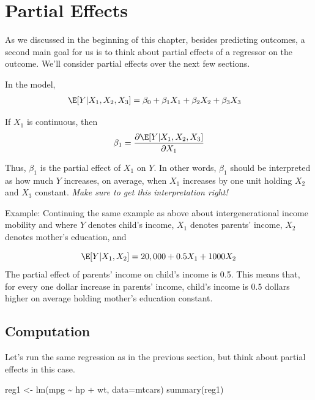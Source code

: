 \documentclass[
  letterpaper,
  DIV=11,
  numbers=noendperiod]{scrreprt}
\newenvironment{Shaded}{\begin{snugshade}}{\end{snugshade}}
\newcommand{\AttributeTok}[1]{\textcolor[rgb]{0.40,0.45,0.13}{#1}}
\newcommand{\FunctionTok}[1]{\textcolor[rgb]{0.28,0.35,0.67}{#1}}
\newcommand{\NormalTok}[1]{\textcolor[rgb]{0.00,0.23,0.31}{#1}}
\newcommand{\OtherTok}[1]{\textcolor[rgb]{0.00,0.23,0.31}{#1}}
\newcommand{\SpecialCharTok}[1]{\textcolor[rgb]{0.37,0.37,0.37}{#1}}
\begin{document}
\section{Partial Effects}\label{partial-effects}

As we discussed in the beginning of this chapter, besides predicting
outcomes, a second main goal for us is to think about partial effects of
a regressor on the outcome. We'll consider partial effects over the next
few sections.

In the model, \begin{align*}
  \E[Y | X_1, X_2, X_3]  &= \beta_0 + \beta_1 X_1 + \beta_2 X_2 + \beta_3 X_3
\end{align*}

If \(X_1\) is continuous, then \begin{align*}
  \beta_1 = \frac{\partial \E[Y|X_1,X_2,X_3]}{\partial X_1}
\end{align*}

Thus, \(\beta_1\) is the partial effect of \(X_1\) on \(Y\). In other
words, \(\beta_1\) should be interpreted as how much \(Y\) increases, on
average, when \(X_1\) increases by one unit holding \(X_2\) and \(X_3\)
constant. \emph{Make sure to get this interpretation right!}

{Example: }Continuing the same example as above about intergenerational
income mobility and where \(Y\) denotes child's income, \(X_1\) denotes
parents' income, \(X_2\) denotes mother's education, and

\[
  \E[Y|X_1,X_2] = 20,000 + 0.5 X_1 + 1000 X_2
\] The partial effect of parents' income on child's income is 0.5. This
means that, for every one dollar increase in parents' income, child's
income is 0.5 dollars higher on average holding mother's education
constant.

\subsection{Computation}\label{computation-1}

Let's run the same regression as in the previous section, but think
about partial effects in this case.

\begin{Shaded}
\begin{Highlighting}[]
\NormalTok{reg1 }\OtherTok{\textless{}{-}} \FunctionTok{lm}\NormalTok{(mpg }\SpecialCharTok{\textasciitilde{}}\NormalTok{ hp }\SpecialCharTok{+}\NormalTok{ wt, }\AttributeTok{data=}\NormalTok{mtcars)}
\FunctionTok{summary}\NormalTok{(reg1)}
\end{Highlighting}
\end{Shaded}
\end{document}
